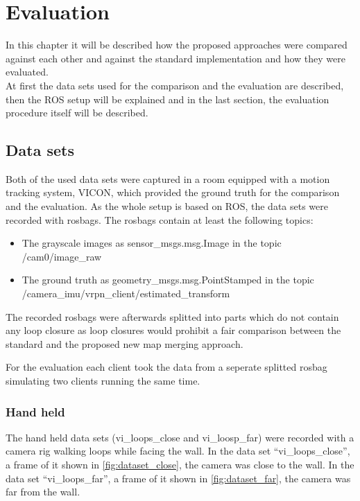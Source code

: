 \chapter{Evaluation}
In this chapter it will be described how the proposed approaches were compared against each other and against the standard implementation and how they were evaluated.\\
At first the data sets used for the comparison and the evaluation are described, then the \acf{ROS} setup will be explained and in the last section, the evaluation procedure itself will be described.

\section{Data sets}
Both of the used data sets were captured in a room equipped with a motion tracking system, VICON, which provided the ground truth for the comparison and the evaluation. As the whole setup is based on \ac{ROS}, the data sets were recorded with rosbags. The rosbags contain at least the following topics:
\begin{itemize}
  \item The grayscale images as sensor\_msgs.msg.Image in the topic /cam0/image\_raw
  \item The ground truth as geometry\_msgs.msg.PointStamped in the topic /camera\_imu/vrpn\_client/estimated\_transform
\end{itemize}

The recorded rosbags were afterwards splitted into parts which do not contain any loop closure as loop closures would prohibit a fair comparison between the standard and the proposed new map merging approach.

For the evaluation each client took the data from a seperate splitted rosbag simulating two clients running the same time.

\subsection{Hand held}
The hand held data sets (vi\_loops\_close and vi\_loosp\_far) were recorded with a camera rig walking loops while facing the wall. In the data set ``vi\_loops\_close'', a frame of it shown in \autoref{fig:dataset_close}, the camera was close to the wall. In the data set ``vi\_loops\_far'', a frame of it shown in \autoref{fig:dataset_far}, the camera was far from the wall.

